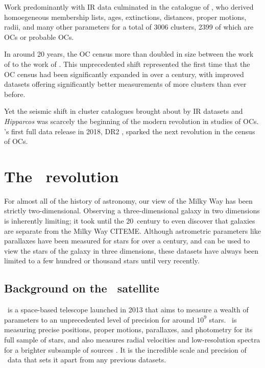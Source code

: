 Work predominantly with IR data culminated in the catalogue of \cite{kharchenko_global_2013}, who derived homoegeneous membership lists, ages, extinctions, distances, proper motions, radii, and many other parameters for a total of 3006 clusters, 2399 of which are OCs or probable OCs. %

In around 20 years, the OC census more than doubled in size between the work of \cite{mermilliod_database_1995} to the work of \cite{kharchenko_global_2013}. This unprecedented shift represented the first time that the OC census had been significantly expanded in over a century, with improved datasets offering significantly better measurements of more clusters than ever before. 

Yet the seismic shift in cluster catalogues brought about by IR datasets and \emph{Hipparcos} was scarcely the beginning of the modern revolution in studies of OCs. \gaia's first full data release in 2018, DR2 \citep{brown_gaia_2018}, sparked the next revolution in the census of OCs.


\section{The \gaia\ revolution}
\label{sec:intro:gaia}

For almost all of the history of astronomy, our view of the Milky Way has been strictly two-dimensional. Observing a three-dimensional galaxy in two dimensions is inherently limiting; it took until the 20\third\ century to even discover that galaxies are separate from the Milky Way CITEME. Although astrometric parameters like parallaxes have been measured for stars for over a century, and can be used to view the stars of the galaxy in three dimensions, these datasets have always been limited to a few hundred or thousand stars until very recently. %

\subsection{Background on the \gaia\ satellite}
\label{sec:intro:history:gaia:background}

\gaia\ is a space-based telescope launched in 2013 that aims to measure a wealth of parameters to an unprecedented level of precision for around $10^9$ stars. \gaia\ is measuring precise positions, proper motions, parallaxes, and photometry for its full sample of stars, and also measures radial velocities and low-resolution spectra for a brighter subsample of sources \citep{gaia_collaboration_gaia_2016}. It is the incredible scale and precision of \gaia\ data that sets it apart from any previous datasets.

